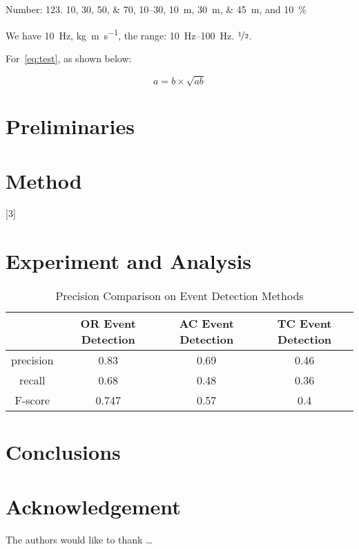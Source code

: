 Number:
\num{123}.
\numlist{10;30;50;70},
\numrange{10}{30},
\SIlist{10;30;45}{\metre},
and
\SI{10}{\percent}



\begin{ConferenceOnly}
We have \SI{10}{\hertz},
\si{\kilogram\metre\per\second},
the range: \SIrange{10}{100}{\hertz}.
$\nicefrac[]{1}{2}$.


\end{ConferenceOnly}


For~\cref{eq:test},
as shown below:

\begin{equation}\label{eq:test}
a = b \times \sqrt{ab}
\end{equation}

\blindmathpaper

\section{Preliminaries} \label{sec-preliminaries}

\blindtext

\gliMarker  %


\section{Method} \label{sec-method}

\blindtext
{}[3]
\blinditemize
\blindenumerate

\blindmathtrue
\blindmathfalse
\blinddescription

\CpenggMarker %

\section{Experiment and Analysis} \label{sec-experiment}


\begin{table}  \centering
  \caption{Precision Comparison on Event Detection Methods}
  \label{tbl:overall-experiments}
  \begin{tabular}{cccc}
\toprule
    & OR Event Detection & AC Event Detection & TC Event Detection \\
\midrule
    precision & 0.83 & 0.69 & 0.46 \\
    recall & 0.68 & 0.48 & 0.36 \\
    F-score & 0.747 & 0.57 & 0.4 \\
\bottomrule
\end{tabular}
\end{table}


\section{Conclusions} \label{sec-conclusions}

\blindtext

\section*{Acknowledgement}

\lipsum[1]


The authors would like to thank \ldots

